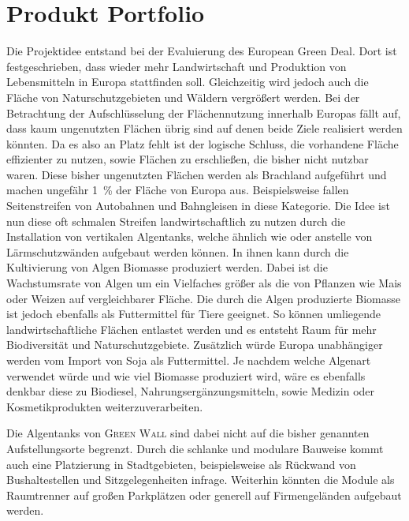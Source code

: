     \section{Produkt Portfolio}
        Die Projektidee entstand bei der Evaluierung des European Green Deal.
        Dort ist festgeschrieben, dass wieder mehr Landwirtschaft und Produktion von Lebensmitteln in Europa stattfinden soll.
        Gleichzeitig wird jedoch auch die Fläche von Naturschutzgebieten und Wäldern vergrößert werden.
        Bei der Betrachtung der Aufschlüsselung der Flächennutzung innerhalb Europas fällt auf, dass kaum ungenutzten Flächen übrig sind auf denen beide Ziele realisiert werden könnten.
        Da es also an Platz fehlt ist der logische Schluss, die vorhandene Fläche effizienter zu nutzen, sowie Flächen zu erschließen, die bisher nicht nutzbar waren.
        Diese bisher ungenutzten Flächen werden als Brachland aufgeführt und machen ungefähr \qty{1}{\percent} der Fläche von Europa aus.
        Beispielsweise fallen Seitenstreifen von Autobahnen und Bahngleisen in diese Kategorie.
        Die Idee ist nun diese oft schmalen Streifen landwirtschaftlich zu nutzen durch die Installation von vertikalen Algentanks, welche ähnlich wie oder anstelle von Lärmschutzwänden aufgebaut werden können.
        In ihnen kann durch die Kultivierung von Algen Biomasse produziert werden.
        Dabei ist die Wachstumsrate von Algen um ein Vielfaches größer als die von Pflanzen wie Mais oder Weizen auf vergleichbarer Fläche.
        Die durch die Algen produzierte Biomasse ist jedoch ebenfalls als Futtermittel für Tiere geeignet.
        So können umliegende landwirtschaftliche Flächen entlastet werden und es entsteht Raum für mehr Biodiversität und Naturschutzgebiete.
        Zusätzlich würde Europa unabhängiger werden vom Import von Soja als Futtermittel.
        Je nachdem welche Algenart verwendet würde und wie viel Biomasse produziert wird, wäre es ebenfalls denkbar diese zu Biodiesel, Nahrungsergänzungsmitteln, sowie Medizin oder Kosmetikprodukten weiterzuverarbeiten.\par\medskip
        
        Die Algentanks von \textsc{Green Wall} sind dabei nicht auf die bisher genannten Aufstellungsorte begrenzt.
        Durch die schlanke und modulare Bauweise kommt auch eine Platzierung in Stadtgebieten, beispielsweise als Rückwand von Bushaltestellen und Sitzgelegenheiten infrage.
        Weiterhin könnten die Module als Raumtrenner auf großen Parkplätzen oder generell auf Firmengeländen aufgebaut werden.\par\medskip

